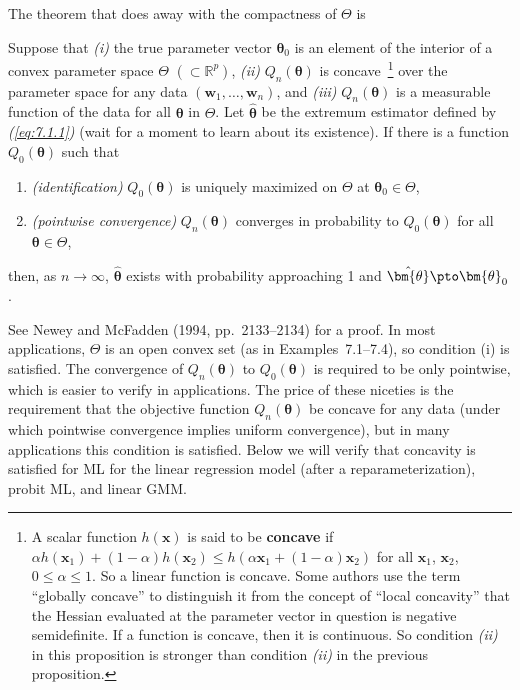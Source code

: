 The theorem that does away with the compactness of $\Theta$ is

\begin{proposition}
\label{prop:7.2}
Suppose that \emph{(i)} the true parameter vector $\bm{\theta}_0$ is an element of the interior of a convex parameter space $\Theta$ $(\subset \mathbb{R}^p)$, \emph{(ii)} $Q_n(\bm{\theta})$ is concave\,%
\footnote{A scalar function $h(\mathbf{x})$ is said to be \textbf{concave} if $\alpha h(\mathbf{x}_1) + (1-\alpha)h(\mathbf{x}_2) \leq h(\alpha \mathbf{x}_1 + (1-\alpha)\mathbf{x}_2)$ for all $\mathbf{x}_1$, $\mathbf{x}_2$, $0 \leq \alpha \leq 1$. So a linear function is concave. Some authors use the term ``globally concave'' to distinguish it from the concept of ``local concavity'' that the Hessian evaluated at the parameter vector in question is negative semidefinite. If a function is concave, then it is continuous. So condition \emph{(ii)} in this proposition is stronger than condition \emph{(ii)} in the previous proposition.}
over the parameter space for any data $(\mathbf{w}_1, \ldots, \mathbf{w}_n)$, and \emph{(iii)} $Q_n(\bm{\theta})$ is a measurable function of the data for all $\bm{\theta}$ in $\Theta$. Let $\hat{\bm{\theta}}$ be the extremum estimator defined by \emph{(\ref{eq:7.1.1})} (wait for a moment to learn about its existence). If there is a function $Q_0(\bm{\theta})$ such that
\begin{enumerate}[label=(\alph*)]
\item \emph{(identification)} \enspace $Q_0(\bm{\theta})$ is uniquely maximized on $\Theta$ at $\bm{\theta}_0 \in \Theta$,
\item \emph{(pointwise convergence)} \enspace $Q_n(\bm{\theta})$ converges in probability to $Q_0(\bm{\theta})$ for all $\bm{\theta} \in \Theta$,
\end{enumerate}
then, as $n \to \infty$, $\hat{\bm{\theta}}$ exists with probability approaching 1 and $\hat{\bm{\theta}} \pto \bm{\theta}_0$.
\end{proposition}

See Newey and McFadden (1994, pp.~2133--2134) for a proof. In most applications, $\Theta$ is an open convex set (as in Examples~7.1--7.4), so condition (i) is satisfied. The convergence of $Q_n(\bm{\theta})$ to $Q_0(\bm{\theta})$ is required to be only pointwise, which is easier to verify in applications. The price of these niceties is the requirement that the objective function $Q_n(\bm{\theta})$ be concave for any data (under which pointwise convergence implies uniform convergence), but in many applications this condition is satisfied. Below we will verify that concavity is satisfied for ML for the linear regression model (after a reparameterization), probit ML, and linear GMM.

